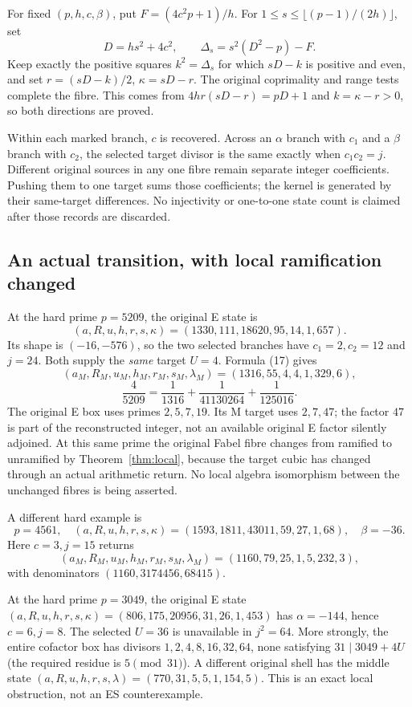 For fixed $(p,h,c,\beta)$, put $F=(4c^2p+1)/h$. For
$1\le s\le\lfloor(p-1)/(2h)\rfloor$, set
\[
 D=hs^2+4c^2,\qquad \Delta_s=s^2(D^2-p)-F.
\]
Keep exactly the positive squares $k^2=\Delta_s$ for which
$sD-k$ is positive and even, and set $r=(sD-k)/2$, $\kappa=sD-r$.
The original coprimality and range tests complete the fibre. This comes from
$4hr(sD-r)=pD+1$ and $k=\kappa-r>0$, so both directions are proved.

Within each marked branch, $c$ is recovered. Across an $\alpha$ branch with
$c_1$ and a $\beta$ branch with $c_2$, the selected target divisor is the same
exactly when $c_1c_2=j$. Different original sources in any one fibre remain
separate integer coefficients. Pushing them to one target sums those coefficients;
the kernel is generated by their same-target differences. No injectivity or
one-to-one state count is claimed after those records are discarded.

\subsection{An actual transition, with local ramification changed}
At the hard prime $p=5209$, the original E state is
\[
 (a,R,u,h,r,s,\kappa)=(1330,111,18620,95,14,1,657).
\]
Its shape is $(-16,-576)$, so the two selected branches have $c_1=2,c_2=12$
and $j=24$. Both supply the \emph{same} target $U=4$. Formula (17) gives
\[
 (a_M,R_M,u_M,h_M,r_M,s_M,\lambda_M)=(1316,55,4,4,1,329,6),
\]
\[
 \boxed{\frac4{5209}=\frac1{1316}+\frac1{41130264}+\frac1{125016}.}   \tag{18}
\]
The original E box uses primes $2,5,7,19$. Its M target uses $2,7,47$; the
factor $47$ is part of the reconstructed integer, not an available original
E factor silently adjoined. At this same prime the original Fabel fibre changes
from ramified to unramified by Theorem~\ref{thm:local}, because the target cubic
has changed through an actual arithmetic return. No local algebra isomorphism
between the unchanged fibres is being asserted.

A different hard example is
\[
 p=4561,\quad(a,R,u,h,r,s,\kappa)=(1593,1811,43011,59,27,1,68),
 \quad\beta=-36.
\]
Here $c=3,j=15$ returns
\[
 (a_M,R_M,u_M,h_M,r_M,s_M,\lambda_M)=(1160,79,25,1,5,232,3),
\]
with denominators $(1160,3174456,68415)$.

At the hard prime $p=3049$, the original E state
$(a,R,u,h,r,s,\kappa)=(806,175,20956,31,26,1,453)$ has
$\alpha=-144$, hence $c=6,j=8$. The selected $U=36$ is unavailable in $j^2=64$.
More strongly, the entire cofactor box has divisors
$1,2,4,8,16,32,64$, none satisfying $31\mid3049+4U$ (the required residue
is $5\pmod{31}$). A different original shell has the middle state
$(a,R,u,h,r,s,\lambda)=(770,31,5,5,1,154,5)$.
This is an exact local obstruction, not an ES counterexample.

